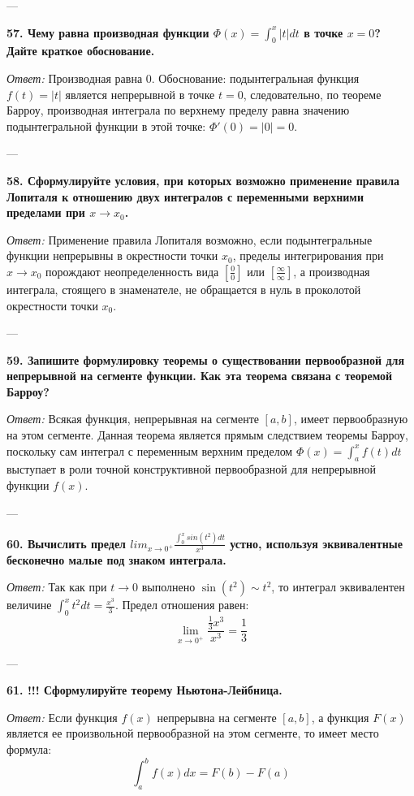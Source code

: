 \documentclass{article}
\begin{document}
---

\textbf{57. Чему равна производная функции $\Phi(x)=\int_{0}^{x}|t|dt$ в точке $x=0$? Дайте краткое обоснование.}

\textit{Ответ:} Производная равна $0$. Обоснование: подынтегральная функция $f(t) = |t|$ является непрерывной в точке $t = 0$, следовательно, по теореме Барроу, производная интеграла по верхнему пределу равна значению подынтегральной функции в этой точке: $\Phi'(0) = |0| = 0$.

---

\textbf{58. Сформулируйте условия, при которых возможно применение правила Лопиталя к отношению двух интегралов с переменными верхними пределами при $x\rightarrow x_{0}$.}

\textit{Ответ:} Применение правила Лопиталя возможно, если подынтегральные функции непрерывны в окрестности точки $x_0$, пределы интегрирования при $x \to x_0$ порождают неопределенность вида $\left[\frac{0}{0}\right]$ или $\left[\frac{\infty}{\infty}\right]$, а производная интеграла, стоящего в знаменателе, не обращается в нуль в проколотой окрестности точки $x_0$.

---

\textbf{59. Запишите формулировку теоремы о существовании первообразной для непрерывной на сегменте функции. Как эта теорема связана с теоремой Барроу?}

\textit{Ответ:} Всякая функция, непрерывная на сегменте $[a, b]$, имеет первообразную на этом сегменте. Данная теорема является прямым следствием теоремы Барроу, поскольку сам интеграл с переменным верхним пределом $\Phi(x) = \int_a^x f(t) dt$ выступает в роли точной конструктивной первообразной для непрерывной функции $f(x)$.

---

\textbf{60. Вычислить предел $lim_{x\rightarrow0^{+}}\frac{\int_{0}^{x}sin(t^{2})dt}{x^{3}}$ устно, используя эквивалентные бесконечно малые под знаком интеграла.}

\textit{Ответ:} Так как при $t \to 0$ выполнено $\sin(t^2) \sim t^2$, то интеграл эквивалентен величине $\int_0^x t^2 dt = \frac{x^3}{3}$. Предел отношения равен:
$$ \lim_{x \to 0^+} \frac{\frac{1}{3}x^3}{x^3} = \frac{1}{3} $$

---

\textbf{61. !!! Сформулируйте теорему Ньютона-Лейбница.}

\textit{Ответ:} Если функция $f(x)$ непрерывна на сегменте $[a, b]$, а функция $F(x)$ является ее произвольной первообразной на этом сегменте, то имеет место формула:
$$ \int_a^b f(x) dx = F(b) - F(a) $$
\end{document}
